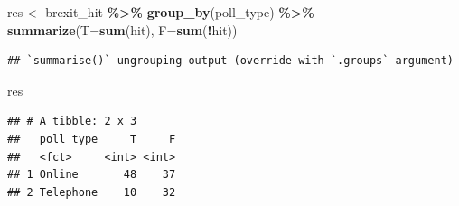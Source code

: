 \documentclass[
]{article}
\newenvironment{Shaded}{\begin{snugshade}}{\end{snugshade}}
\newcommand{\DataTypeTok}[1]{\textcolor[rgb]{0.13,0.29,0.53}{#1}}
\newcommand{\KeywordTok}[1]{\textcolor[rgb]{0.13,0.29,0.53}{\textbf{#1}}}
\newcommand{\NormalTok}[1]{#1}
\newcommand{\OperatorTok}[1]{\textcolor[rgb]{0.81,0.36,0.00}{\textbf{#1}}}
\newcommand{\OtherTok}[1]{\textcolor[rgb]{0.56,0.35,0.01}{#1}}
\newcommand{\StringTok}[1]{\textcolor[rgb]{0.31,0.60,0.02}{#1}}
\begin{document}
\begin{Shaded}
\begin{Highlighting}[]
\NormalTok{res \textless{}{-}}\StringTok{ }\NormalTok{brexit\_hit }\OperatorTok{\%\textgreater{}\%}\StringTok{ }
\StringTok{  }\KeywordTok{group\_by}\NormalTok{(poll\_type) }\OperatorTok{\%\textgreater{}\%}
\StringTok{  }\KeywordTok{summarize}\NormalTok{(}\DataTypeTok{T=}\KeywordTok{sum}\NormalTok{(hit), }\DataTypeTok{F=}\KeywordTok{sum}\NormalTok{(}\OperatorTok{!}\NormalTok{hit))}
\end{Highlighting}
\end{Shaded}

\begin{verbatim}
## `summarise()` ungrouping output (override with `.groups` argument)
\end{verbatim}

\begin{Shaded}
\begin{Highlighting}[]
\NormalTok{res}
\end{Highlighting}
\end{Shaded}

\begin{verbatim}
## # A tibble: 2 x 3
##   poll_type     T     F
##   <fct>     <int> <int>
## 1 Online       48    37
## 2 Telephone    10    32
\end{verbatim}

\begin{Shaded}
\end{Shaded}
\end{document}
